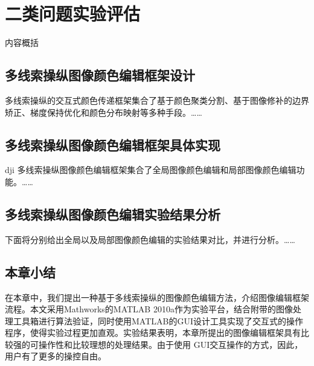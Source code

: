\chapter{二类问题实验评估}\label{sec:experiments}
内容概括

\section{多线索操纵图像颜色编辑框架设计}
多线索操纵的交互式颜色传递框架集合了基于颜色聚类分割、基于图像修补的边界矫正、梯度保持优化和颜色分布映射等多种手段\cite{Zuo10}。……

\section{多线索操纵图像颜色编辑框架具体实现}dji
多线索操纵图像颜色编辑框架集合了全局图像颜色编辑和局部图像颜色编辑功能。……

\section{多线索操纵图像颜色编辑实验结果分析}
下面将分别给出全局以及局部图像颜色编辑的实验结果对比，并进行分析。……

\section{本章小结}
在本章中，我们提出一种基于多线索操纵的图像颜色编辑方法，介绍图像编辑框架流程。本文采用Mathworks的MATLAB 2010a作为实验平台，结合附带的图像处理工具箱进行算法验证，同时使用MATLAB的GUI设计工具实现了交互式的操作程序，使得实验过程更加直观。实验结果表明，本章所提出的图像编辑框架具有比较强的可操作性和比较理想的处理结果。由于使用 GUI交互操作的方式，因此，用户有了更多的操控自由。


